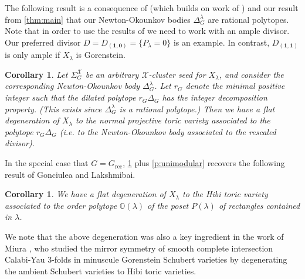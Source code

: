 \documentclass{amsart}
\newtheorem{cor}[thm]{Corollary}
\theoremstyle{definition}
\numberwithin{equation}{section}
\newcommand{\Comment}[1]{{\color{blue} \sf ($\clubsuit$ #1 $\clubsuit$)}}
\newcommand{\NO}{\Delta}
\newcommand{\RG}{r_G}
\newcommand{\rect}{\mathrm{rec}}
\newcommand{\OO}{\mathbb{O}}
\begin{document}
The following result is a consequence of
 \cite[Section 17]{RW} (which builds on work of \cite{Anderson})
 and our result from \cref{thm:main}
 that our Newton-Okounkov bodies $\Delta_G^{\lambda}$ are rational polytopes.
 Note that in order to use the results of \cite{Anderson} we need to work with 
 an ample divisor. Our preferred divisor $D=D_{(\mathbf{1},\mathbf{0})}=\{P_\lambda=0\}$ is an example. In contrast, $D_{(\mathbf{1},\mathbf{1})}$ is only ample if $X_\lambda$ is Gorenstein. 


\begin{cor}\cite[Corollary 17.11]{RW}\label{cor:degeneration}
Let $\Sigma_G^{\mathcal X}$ be an arbitrary $\mathcal X$-cluster seed
for $X_{\lambda}$, and consider the corresponding  Newton-Okounkov body
$\Delta_G^{\lambda}$.
Let $\RG$ denote the minimal positive integer such that
the dilated polytope
$\RG\NO_G$ has the \emph{integer decomposition property}.  (This exists
since $\Delta_G^{\lambda}$ is a rational polytope.)
Then we have a flat degeneration of $X_{\lambda}$
to the normal projective toric variety
associated to the polytope $\RG\Delta_G$ (i.e. to
        the Newton-Okounkov body associated to the rescaled divisor).
\end{cor}

In the special case that $G=G_{\rect}$, \cref{cor:degeneration}
plus \cref{p:unimodular}
recovers the following result
of Gonciulea and Lakshmibai.
\begin{cor}\cite[Theorem 7.34]{GL}
We have a flat degeneration of $X_{\lambda}$ to
the \emph{Hibi toric variety} associated to the order polytope
$\OO(\lambda)$ 
 of the poset $P(\lambda)$
of rectangles contained in $\lambda$.  
\end{cor}


We note that the above degeneration was also a key ingredient in  the work of Miura
\cite{Miura:minuscule}, who studied the mirror symmetry of smooth complete
intersection Calabi-Yau $3$-folds in minuscule Gorenstein Schubert varieties by 
degenerating the ambient Schubert varieties to Hibi toric varieties.
\end{document}
